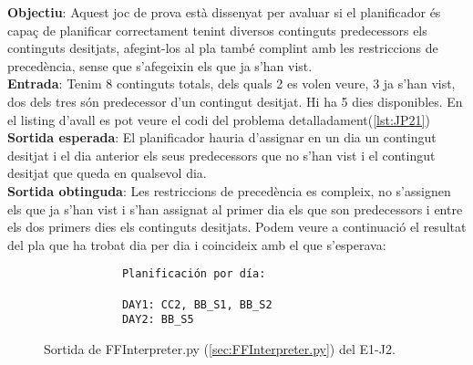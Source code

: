 \documentclass[a4paper]{article}
\begin{document}
	\noindent \textbf{Objectiu}: Aquest joc de prova està dissenyat per avaluar si el planificador és capaç de planificar correctament tenint diversos continguts predecessors els continguts desitjats, afegint-los al pla també complint amb les restriccions de precedència, sense que s'afegeixin els que ja s'han vist. \\
	
	\noindent \textbf{Entrada}: Tenim 8 continguts totals, dels quals 2 es volen veure, 3 ja s'han vist, dos dels tres són predecessor d'un contingut desitjat. Hi ha 5 dies disponibles. En el listing d'avall es pot veure el codi del problema detalladament(\ref{lst:JP21}) \\
	
	\noindent \textbf{Sortida esperada}: El planificador hauria d'assignar en un dia un contingut desitjat i el dia anterior els seus predecessors que no s'han vist i el contingut desitjat que queda en qualsevol dia. \\
	
	\noindent \textbf{Sortida obtinguda}: Les restriccions de 
	precedència es compleix, no s'assignen els que ja s'han vist i s'han assignat al primer dia els que son predecessors i entre els dos primers dies els continguts desitjats. Podem veure a continuació el resultat del pla que ha trobat dia per dia i coincideix amb el que s'esperava:
	
	\begin{figure}[H]
		\centering
		\begin{verbatim}
			Planificación por día:
			
			DAY1: CC2, BB_S1, BB_S2
			DAY2: BB_S5
		\end{verbatim}
		\caption{Sortida de FFInterpreter.py (\ref{sec:FFInterpreter.py}) del E1-J2.}
	\end{figure}	
	
\end{document}
